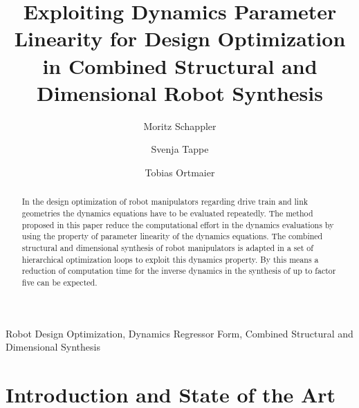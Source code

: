 \documentclass{svproc}
\begin{document}
    
\mainmatter              %
%
\title{Exploiting Dynamics Parameter Linearity for Design Optimization in Combined Structural and Dimensional Robot Synthesis}
%
%
\author{Moritz Schappler \and Svenja Tappe \and Tobias Ortmaier}
%
%
%

\maketitle              %


\begin{abstract}
In the design optimization of robot manipulators regarding drive train and link geometries the dynamics equations have to be evaluated repeatedly.
The method proposed in this paper reduce the computational effort in the dynamics evaluations by using the property of parameter linearity of the dynamics equations.
The combined structural and dimensional synthesis of robot manipulators is adapted in a set of hierarchical optimization loops to exploit this dynamics property.
By this means a reduction of computation time for the inverse dynamics in the synthesis of up to factor five can be expected.
\end{abstract}

\begin{keywords}
Robot Design Optimization, Dynamics Regressor Form, Combined Structural and Dimensional Synthesis
\end{keywords}

\section{Introduction and State of the Art}
\label{sec:Intro}

\end{document}
